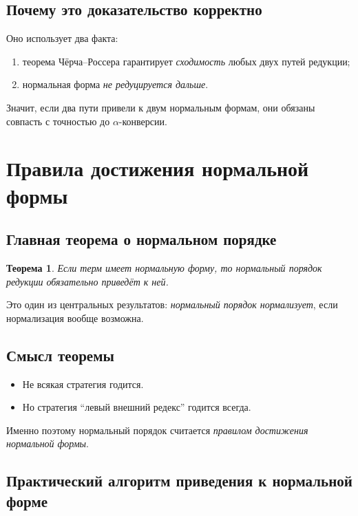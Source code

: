 \documentclass[12pt,a4paper]{article}
\newtheorem{theorem}{Теорема}
\theoremstyle{remark}
\begin{document}
\subsection{Почему это доказательство корректно}

Оно использует два факта:

\begin{enumerate}
    \item теорема Чёрча--Россера гарантирует \emph{сходимость} любых двух путей редукции;
    \item нормальная форма \emph{не редуцируется дальше}.
\end{enumerate}

Значит, если два пути привели к двум нормальным формам, они обязаны совпасть с точностью до $\alpha$-конверсии.

\section{Правила достижения нормальной формы}

\subsection{Главная теорема о нормальном порядке}

\begin{theorem}
Если терм имеет нормальную форму, то нормальный порядок редукции обязательно приведёт к ней.
\end{theorem}

Это один из центральных результатов: \emph{нормальный порядок нормализует}, если нормализация вообще возможна.

\subsection{Смысл теоремы}

\begin{itemize}
    \item Не всякая стратегия годится.
    \item Но стратегия ``левый внешний редекс'' годится всегда.
\end{itemize}

Именно поэтому нормальный порядок считается \emph{правилом достижения нормальной формы}.

\subsection{Практический алгоритм приведения к нормальной форме}
\end{document}
